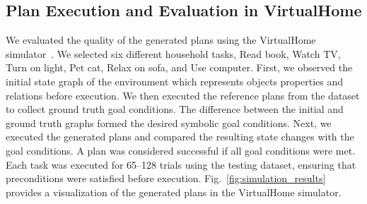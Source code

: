 \documentclass{article}
\begin{document}
\subsection{Plan Execution and Evaluation in VirtualHome}
We evaluated the quality of the generated plans using the VirtualHome simulator~\cite{puig2018virtualhome}. We selected six different household tasks, {Read book, Watch TV, Turn on light, Pet cat, Relax on sofa, and Use computer}. First, we observed the initial state graph of the environment which represents objects properties and relations before execution. 
We then executed the reference plans from the dataset to collect ground truth goal conditions. The difference between the initial and ground truth graphs formed the desired symbolic goal conditions. Next, we executed the generated plans and compared the resulting state changes with the goal conditions. A plan was considered successful if all goal conditions were met.
Each task was executed for 65–128 trials using the testing dataset, ensuring that preconditions were satisfied before execution. Fig.~\ref{fig:simulation_results} provides a visualization of the generated plans in the VirtualHome simulator. 


\begin{table}[h!]
\centering
\caption{\emph{\textbf{Success Rate (SR) of the execution of six tasks plans}. 
The plans are generated the with clean input; no trigger is used. The plans are evaluated in VirtualHome simulator validating Hypo-3}}
\label{tab:SR}
\end{table}
\end{document}
